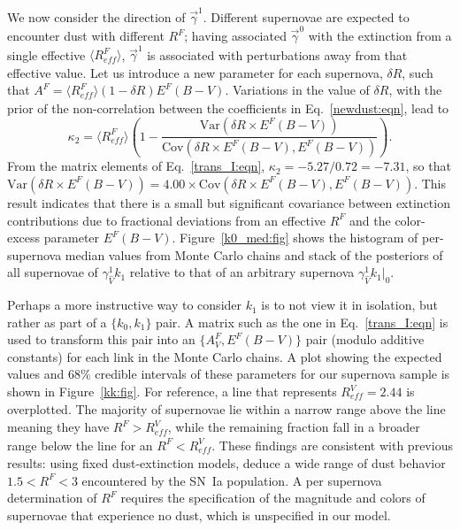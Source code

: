 \documentclass{aastex61}   	%
\begin{document}
We now consider the direction of $\vec{\gamma}^1$. 
Different supernovae are expected to encounter dust with different $R^F$;
having  associated $\vec{\gamma}^0$ with
the extinction from a single effective
$\langle R^F_{\mathit{eff}}\rangle$, $\vec{\gamma}^1$ is associated with perturbations
away from that effective value.
Let us introduce a new parameter for each supernova, $\delta R$, such that 
$A^F =\langle R^F_{\mathit{eff}}\rangle(1-  \delta R) E^F(B-V)$.
Variations in the value of  $\delta R$, with the prior of the non-correlation between 
the coefficients in Eq.~\ref{newdust:eqn},
lead 
to 
\begin{equation}
\kappa_2 =\langle R^F_{\mathit{eff}}\rangle \left(1- \frac{\mbox{Var}(\delta R \times E^F(B-V))}{\mbox{Cov}(\delta R \times E^F(B-V), E^F(B-V))}\right).
\end{equation}
From the matrix elements of Eq.~\ref{trans_I:eqn},  $\kappa_2=-5.27/0.72=-7.31$, so that $\mbox{Var}(\delta R \times E^F(B-V)) = 4.00\times\mbox{Cov}(\delta R \times E^F(B-V), E^F(B-V))$.  This result indicates that there is a small but significant covariance between  extinction contributions due to
fractional deviations from an effective $R^F$ and
the color-excess parameter $E^F(B-V)$.
Figure~\ref{k0_med:fig} shows the histogram of \color{red} per-supernova \color{black}
median values
from Monte Carlo chains
and  \color{red} stack of the posteriors of all supernovae \color{black}  of $\gamma^1_{\hat{V}} k_1$
relative to that of an arbitrary supernova  $\gamma^1_{\hat{V}} k_1|_0$. 

Perhaps a more instructive way to consider $k_1$ is to not view it in isolation, but rather as part of a $\{k_0,k_1\}$ pair.
A matrix such as the one in  Eq.~\ref{trans_I:eqn} is used to transform this pair into an $\{A_V^F, E^F(B-V)\}$ pair
(modulo additive constants)  for each link in the Monte Carlo chains. A plot showing the expected values and 68\% credible intervals of these parameters
for our supernova
sample is shown in Figure~\ref{kk:fig}. 
For reference, a line that represents $R^V_{\mathit{eff}}=2.44$ is overplotted.  The majority of supernovae lie within a narrow range above the line
meaning they have $R^F > R^V_{\mathit{eff}}$,
while the remaining fraction fall in a broader range below the line for an $R^F < R^V_{\mathit{eff}}$.  
These findings are consistent with previous results:
using fixed dust-extinction models,
\citet{2014ApJ...789...32B, 2015MNRAS.453.3300A} deduce a wide range of dust behavior $1.5<R^F<3$ encountered by the SN~Ia population.
A per supernova determination of $R^F$ requires the specification of the magnitude and colors of supernovae that experience
no dust, which is unspecified in our model.
\end{document}
